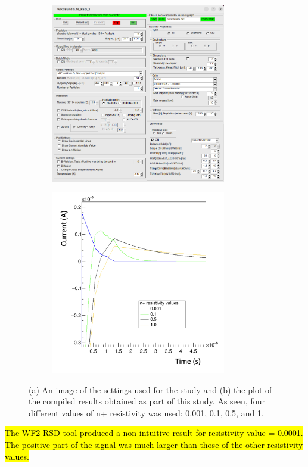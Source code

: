 \documentclass[11pt]{article}
\newcommand{\hlyellow}[1]{{\sethlcolor{yellow}\hl{#1}}}
\begin{document}
\begin{figure}[h!]
    \centering
    \begin{subfigure}[t]{0.49\textwidth}
        \centering
        \includegraphics[width=3in]{Images/n_resistivity_other_settings.png}
        \caption{}
        \label{fig:n_resistivity_other_settings}
    \end{subfigure}%
    \begin{subfigure}[t]{0.49\textwidth}
        \centering
        \includegraphics[width=3in]{Images/n_resistivity_plot.png}
        \caption{}
        \label{fig:n_resistivity_plot}
    \end{subfigure}
    \caption{(a) An image of the settings used for the study and (b) the plot of the compiled results obtained as part of this study. As seen, four different values of n+ resistivity was used: 0.001, 0.1, 0.5, and 1.}
\end{figure}

\hlyellow{The WF2-RSD tool produced a non-intuitive result for resistivity value = 0.0001. The positive part of the signal was much larger than those of the other resistivity values.}
\end{document}
